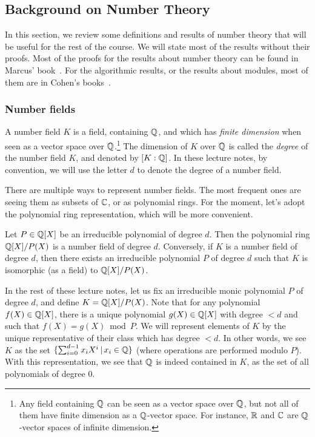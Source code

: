 \subsection{Background on Number Theory}
\label{sec:number-theory}
In this section, we review some definitions and results of number theory that will be useful for the rest of the course. We will state most of the results without their proofs. Most of the proofs for the results about number theory can be found in Marcus' book~\cite{Marcus}. For the algorithmic results, or the results about modules, most of them are in Cohen's books~\cite{Cohen1, Cohen2}.


\subsubsection{Number fields}

A number field $K$ is a field, containing $\mathbb{Q}$, and which has \emph{finite dimension} when seen as a vector space over $\mathbb{Q}$.\footnote{Any field containing $\mathbb{Q}$ can be seen as a vector space over $\mathbb{Q}$, but not all of them have finite dimension as a $\mathbb{Q}$-vector space. For instance, $\mathbb{R}$ and $\mathbb{C}$ are $\mathbb{Q}$-vector spaces of infinite dimension.} The dimension of $K$ over $\mathbb{Q}$ is called the \emph{degree} of the number field $K$, and denoted by $[K:\mathbb{Q}]$. In these lecture notes, by convention, we will use the letter $d$ to denote the degree of a number field.

There are multiple ways to represent number fields. The most frequent ones are seeing them as subsets of $\mathbb{C}$, or as polynomial rings. For the moment, let's adopt the polynomial ring representation, which will be more convenient.

\begin{lemma}
\label{le:nb-field-eq-def}
Let $P \in \mathbb{Q}[X]$ be an irreducible polynomial of degree $d$. Then the polynomial ring $\mathbb{Q}[X]/P(X)$ is a number field of degree $d$.
Conversely, if $K$ is a number field of degree $d$, then there exists an irreducible polynomial $P$ of degree $d$ such that $K$ is isomorphic (as a field) to $\mathbb{Q}[X]/P(X)$.
\end{lemma}

In the rest of these lecture notes, let us fix an irreducible monic polynomial $P$ of degree $d$, and define $K = \mathbb{Q}[X]/P(X)$. Note that for any polynomial $f(X) \in \mathbb{Q}[X]$, there is a unique polynomial $g(X) \in \mathbb{Q}[X]$ with degree $< d$ and such that $f(X) = g(X) \bmod P$. We will represent elements of $K$ by the unique representative of their class which has degree $< d$. In other words, we see $K$ as the set $\{\sum_{i = 0}^{d-1} x_i X^i\,|\, x_i \in \mathbb{Q}\}$ (where operations are performed modulo $P$). With this representation, we see that $\mathbb{Q}$ is indeed contained in $K$, as the set of all polynomials of degree $0$.

